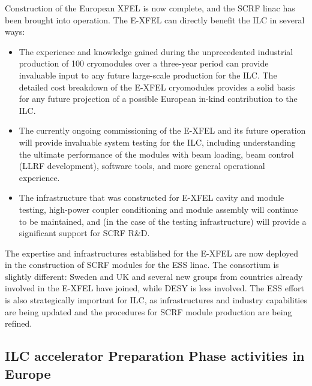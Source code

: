 \documentclass[%
 reprint,
 floatfix,
 amsmath,amssymb,
 aps,
]{revtex4-1}
\begin{document}
Construction of the European XFEL is now complete, and the SCRF linac has been brought into operation. The E-XFEL can directly benefit the ILC in several ways: 
\begin{itemize}
\item The experience and knowledge gained during the unprecedented industrial production of 100 cryomodules over a three-year period can provide 
invaluable input to any future large-scale production for the ILC. The detailed cost breakdown of the E-XFEL cryomodules 
provides a solid basis for any future projection of a possible European in-kind contribution to the ILC. 
\item 
The currently ongoing commissioning of the E-XFEL and its future operation will provide invaluable system testing for the ILC, 
including understanding the ultimate performance of the modules with beam loading, beam control (LLRF development), software tools, 
and more general operational experience. 
\item The infrastructure that was constructed for E-XFEL cavity and module
testing, high-power coupler conditioning and module assembly will continue to be maintained, and (in the case of the testing infrastructure) will provide a significant support for SCRF R\&D.
\end{itemize}

The expertise and infrastructures established for the E-XFEL are now deployed in the construction of SCRF modules for the ESS linac. 
The consortium is slightly different: Sweden and UK and several new groups from countries already involved in the E-XFEL have joined, while DESY is less involved.
The ESS effort is also strategically important for ILC, as infrastructures and industry capabilities are being updated and the procedures for SCRF module production are being refined.

\subsection{ILC accelerator Preparation Phase activities in Europe ~\label{sec:acc:prephase}}
\end{document}
